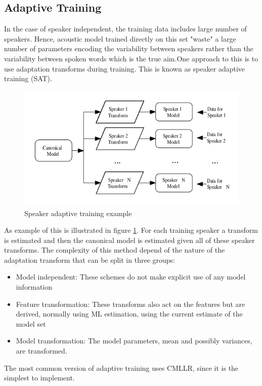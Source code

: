 \subsection{Adaptive Training}\label{at}
In the case of speaker independent, the training data includes large number of speakers. Hence, acoustic model trained directly on this set "waste" a large number of parameters encoding the variability between speakers rather than the variability between spoken words which is the true aim.One approach to this is to use adaptation transforms during training. This is known as speaker adaptive training (SAT).
\begin{figure} [!htb]
	\begin{center}
	\includegraphics[width=1\textwidth]{img/sat2.png}
	\end{center}
	\caption{\label{satimg}Speaker adaptive training example}
\end{figure}
As example of this is illustrated in figure \ref{satimg}. For each training speaker a transform is estimated and then the canonical model is estimated given all of these speaker transforms. The complexity of this method depend of the nature of the adaptation transform that can be split in three groups:
\begin{itemize}
	\item Model independent: These schemes do not make explicit use of any model information
	\item Feature transformation: These transforms also act on the features but are derived, normally using ML estimation, using the current estimate of the model set
	\item Model transformation: The model parameters, mean and possibly variances, are transformed.
\end{itemize}
The most common version of adaptive training uses CMLLR, since it is the simplest to implement.